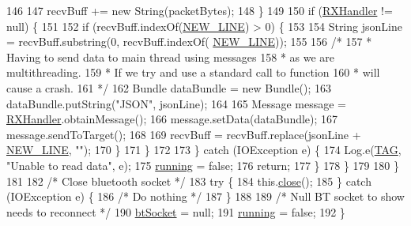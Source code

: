 \begin{DoxyCode}
146 
147                         recvBuff += \textcolor{keyword}{new} String(packetBytes);
148                     \}
149 
150                     \textcolor{keywordflow}{if} (\hyperlink{classcom_1_1jack_1_1motorbikestatistics_1_1_b_t_connection_a64fc7b02a2b9f052c6b05842b79b3cdc}{RXHandler} != null) \{
151 
152                         \textcolor{keywordflow}{if} (recvBuff.indexOf(\hyperlink{classcom_1_1jack_1_1motorbikestatistics_1_1_b_t_connection_aacec2fadb24352fd7fdeae731e3ed412}{NEW\_LINE}) > 0) \{
153 
154                             String jsonLine = recvBuff.substring(0, recvBuff.indexOf(
      \hyperlink{classcom_1_1jack_1_1motorbikestatistics_1_1_b_t_connection_aacec2fadb24352fd7fdeae731e3ed412}{NEW\_LINE}));
155 
156                             \textcolor{comment}{/*}
157 \textcolor{comment}{                             * Having to send data to main thread using messages}
158 \textcolor{comment}{                             * as we are multithreading.}
159 \textcolor{comment}{                             * If we try and use a standard call to function}
160 \textcolor{comment}{                             * will cause a crash.}
161 \textcolor{comment}{                             */}
162                             Bundle dataBundle =  \textcolor{keyword}{new} Bundle();
163                             dataBundle.putString(\textcolor{stringliteral}{"JSON"}, jsonLine);
164 
165                             Message message = \hyperlink{classcom_1_1jack_1_1motorbikestatistics_1_1_b_t_connection_a64fc7b02a2b9f052c6b05842b79b3cdc}{RXHandler}.obtainMessage();
166                             message.setData(dataBundle);
167                             message.sendToTarget();
168 
169                             recvBuff = recvBuff.replace(jsonLine + \hyperlink{classcom_1_1jack_1_1motorbikestatistics_1_1_b_t_connection_aacec2fadb24352fd7fdeae731e3ed412}{NEW\_LINE}, \textcolor{stringliteral}{""});
170                         \}
171                     \}
172 
173                 \} \textcolor{keywordflow}{catch} (IOException e) \{
174                     Log.e(\hyperlink{classcom_1_1jack_1_1motorbikestatistics_1_1_b_t_connection_af9455991fec4de29ffc875eae117a761}{TAG}, \textcolor{stringliteral}{"Unable to read data"}, e);
175                     \hyperlink{classcom_1_1jack_1_1motorbikestatistics_1_1_b_t_connection_a6193b7b92b7f2905a3a43d63db40aba8}{running} = \textcolor{keyword}{false};
176                     \textcolor{keywordflow}{return};
177                 \}
178             \}
179 
180         \}
181 
182         \textcolor{comment}{/* Close bluetooth socket */}
183         \textcolor{keywordflow}{try} \{
184             this.\hyperlink{classcom_1_1jack_1_1motorbikestatistics_1_1_b_t_connection_ac1cd0e85a758db424a57010ac9bb87f0}{close}();
185         \} \textcolor{keywordflow}{catch} (IOException e) \{
186             \textcolor{comment}{/* Do nothing */}
187         \}
188 
189         \textcolor{comment}{/* Null BT socket to show needs to reconnect */}
190         \hyperlink{classcom_1_1jack_1_1motorbikestatistics_1_1_b_t_connection_a0d47f94a35f7c8a07429975446e7b33b}{btSocket} = null;
191         \hyperlink{classcom_1_1jack_1_1motorbikestatistics_1_1_b_t_connection_a6193b7b92b7f2905a3a43d63db40aba8}{running} = \textcolor{keyword}{false};
192     \}
\end{DoxyCode}
